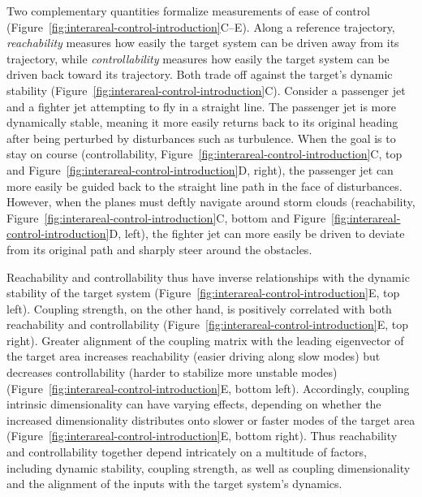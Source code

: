 Two complementary quantities formalize measurements of ease of control (Figure~\ref{fig:interareal-control-introduction}C--E). Along a reference trajectory, \emph{reachability} measures how easily the target system can be driven away from its trajectory, while \emph{controllability} measures how easily the target system can be driven back toward its trajectory.\cite{Lindmark2018-il} Both trade off against the target's dynamic stability (Figure~\ref{fig:interareal-control-introduction}C). Consider a passenger jet and a fighter jet attempting to fly in a straight line. The passenger jet is more dynamically stable, meaning it more easily returns back to its original heading after being perturbed by disturbances such as turbulence. When the goal is to stay on course (controllability, Figure~\ref{fig:interareal-control-introduction}C, top and Figure~\ref{fig:interareal-control-introduction}D, right), the passenger jet can more easily be guided back to the straight line path in the face of disturbances. However, when the planes must deftly navigate around storm clouds (reachability, Figure~\ref{fig:interareal-control-introduction}C, bottom and Figure~\ref{fig:interareal-control-introduction}D, left), the fighter jet can more easily be driven to deviate from its original path and sharply steer around the obstacles.

Reachability and controllability thus have inverse relationships with the dynamic stability of the target system (Figure~\ref{fig:interareal-control-introduction}E, top left). Coupling strength, on the other hand, is positively correlated with both reachability and controllability (Figure~\ref{fig:interareal-control-introduction}E, top right). Greater alignment of the coupling matrix with the leading eigenvector of the target area increases reachability (easier driving along slow modes) but decreases controllability (harder to stabilize more unstable modes) (Figure~\ref{fig:interareal-control-introduction}E, bottom left). Accordingly, coupling intrinsic dimensionality can have varying effects, depending on whether the increased dimensionality distributes onto slower or faster modes of the target area (Figure~\ref{fig:interareal-control-introduction}E, bottom right). Thus reachability and controllability together depend intricately on a multitude of factors, including dynamic stability, coupling strength, as well as coupling dimensionality and the alignment of the inputs with the target system's dynamics.

